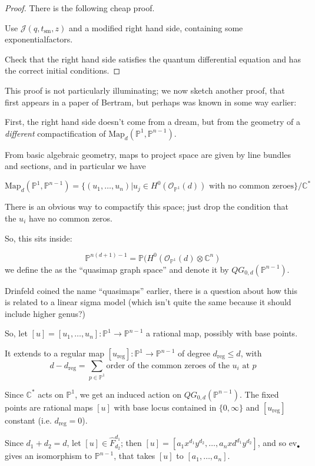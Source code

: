 \documentclass{amsart}
\theoremstyle{definition}
\newcommand{\OO}{\mathcal{O}}
\newcommand{\Map}{\textrm{Map}}
\newcommand{\proj}{\mathbb{P}}
\newcommand{\J}{\mathcal{J}}
\newcommand{\sm}{\text{sm}}
\newcommand{\C}{\mathbb{C}}
\newcommand{\ev}{\text{ev}}
\begin{document}
\begin{proof} 
There is the following cheap proof.

Use $\J(q,t_\sm,z)$ and a modified right hand side, containing some exponentialfactors.

Check that the right hand side satisfies the quantum differential equation and has the correct initial conditions.
\end{proof}

This proof is not particularly illuminating; we now sketch another proof, that first appears in a paper of Bertram, but perhaps was known in some way earlier:

First, the right hand side doesn't come from a dream, but from the geometry of a \emph{different} compactification of $\text{Map}_d(\proj^1,\proj^{n-1})$.

From basic algebraic geometry, maps to project space are given by line bundles and sections, and in particular we have

$$\Map_d(\proj^1,\proj^{n-1})=\{(u_1,\dots,u_n)|u_j\in H^0(\OO_{\proj^1}(d))\text{ with no common zeroes}\}/\C^*$$

There is an obvious way to compactify this space; just drop the condition that the $u_i$ have no common zeros.

So, this sits inside:

$$\proj^{n(d+1)-1}=\proj(H^0(\OO_{\proj^1}(d)\otimes\C^n)$$
we define the as the ``quasimap graph space'' and denote it by $QG_{0,d}(\proj^{n-1})$.

Drinfeld coined the name ``quasimaps'' earlier, there is a question about how this is related to a linear sigma model (which isn't quite the same because it should include higher genus?)

So, let $[u]=[u_1,\dots,u_n]:\proj^1\to\proj^{n-1}$ a rational map, possibly with base points.

It extends to a regular map $[u_\text{reg}]:\proj^1\to\proj^{n-1}$ of degree $d_{\text{reg}}\leq d$, with 
$$d-d_{\text{reg}}=\sum_{p\in\proj^1}\text{order of the common zeroes of the $u_i$ at $p$}$$

Since $\C^*$ acts on $\proj^1$, we get an induced action on $QG_{0,d}(\proj^{n-1})$.  The fixed points are rational maps $[u]$ with base locus contained in $\{0,\infty\}$ and $[u_{\text{reg}}]$ constant (i.e. $d_{\text{reg}}=0$).

Since $d_1+d_2=d$, let $[u]\in \hat{F}^{d_1}_{d_2}$; then $[u]=[a_1x^{d_1}y^{d_2},\dots,a_nxd^{d_1}y^{d_2}]$, and so $\ev_\bullet$ gives an isomorphism to $\proj^{n-1}$, that takes $[u]$ to $[a_1,\dots, a_n]$.  
\end{document}

